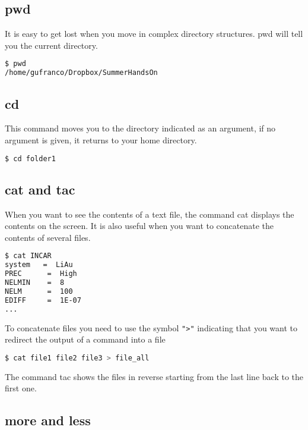 \subsection{pwd}

It is easy to get lost when you move in complex directory structures. pwd will tell you the current directory.

\begin{lstlisting}[language=bash]
$ pwd
/home/gufranco/Dropbox/SummerHandsOn
\end{lstlisting}

\subsection{cd}

This command moves you to the directory indicated as an argument, if no argument is given, it returns to your home directory.

\begin{lstlisting}[language=bash]
$ cd folder1
\end{lstlisting}

\subsection{cat and tac}

When you want to see the contents of a text file, the command cat displays the contents on the screen. It is also useful when you want to concatenate the contents of several files.

\begin{lstlisting}[language=bash]
$ cat INCAR 
system   =  LiAu
PREC      =  High
NELMIN    =  8
NELM      =  100
EDIFF     =  1E-07
...
\end{lstlisting}

To concatenate files you need to use the symbol \texttt{">"} indicating that you want to redirect the output of a command into a file

\begin{lstlisting}[language=bash]
$ cat file1 file2 file3 > file_all
\end{lstlisting}

The command tac shows the files in reverse starting from the last line back to the first one.

\subsection{more and less}

